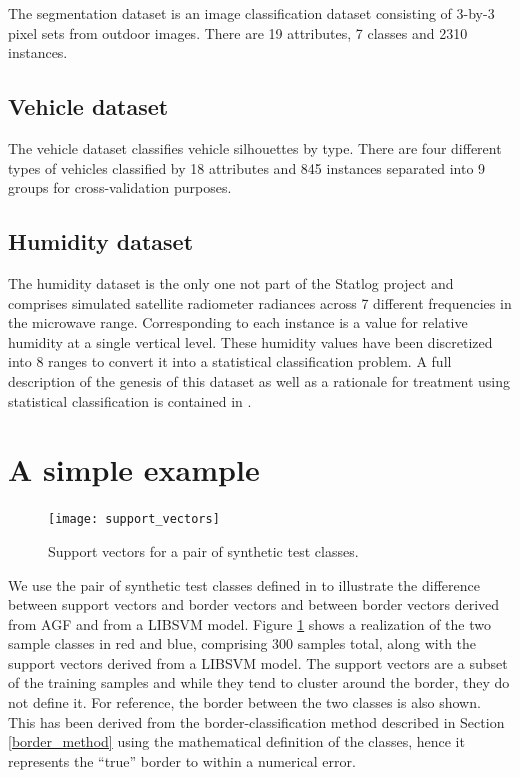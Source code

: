 \documentclass[11pt]{article}
\begin{document}
The segmentation dataset is an image classification dataset consisting of 3-by-3
pixel sets from outdoor images. There are 19 attributes, 7 classes and 2310 instances.

\subsection{Vehicle dataset}

The vehicle dataset classifies vehicle silhouettes by type. There are four different
types of vehicles classified by 18 attributes and 845 instances separated into 9 groups for cross-validation purposes.

\subsection{Humidity dataset}

The humidity dataset is the only one not part of the Statlog project and comprises simulated satellite radiometer radiances across 7 different frequencies in the microwave range.
Corresponding to each instance is a value for relative humidity at a single
vertical level.
These humidity values have been discretized into 8 ranges to convert it into a statistical classification problem.
A full description of the genesis of this dataset as well as a rationale for
treatment using statistical classification is contained in \citet{Mills2009}.

\section{A simple example}

\begin{figure}
\texttt{[image: support\_vectors]}
\caption{Support vectors for a pair of synthetic test classes.}\label{sample_sv}
\end{figure}

We use the pair of synthetic test classes defined in \citet{Mills2011} to 
illustrate the difference between support vectors and border vectors and 
between border vectors derived from AGF and from a LIBSVM model.
Figure \ref{sample_sv} shows a realization of the two sample classes 
in red and blue, comprising 300 samples total, along
with the support vectors derived from a LIBSVM model.
The support vectors are a subset of the training samples and while they
tend to cluster around the border, they do not define it.
For reference, the border between the two classes is also shown.
This has been derived from the border-classification method described in 
Section \ref{border_method} using the mathematical definition of the classes,
hence it represents the ``true'' border to within a numerical error.
\end{document}
